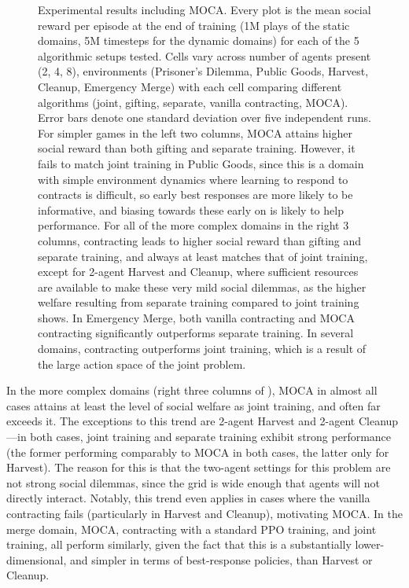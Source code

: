 \documentclass[referee,sn-basic]{sn-jnl}
\theoremstyle{thmstyleone}%
\theoremstyle{thmstyletwo}%
\theoremstyle{thmstylethree}%
\begin{document}
\begin{figure}[!ht]
\caption{Experimental results including MOCA. Every plot is the mean social reward per episode at the end of training (1M plays of the static domains, 5M timesteps for the dynamic domains) for each of the 5 algorithmic setups tested. Cells vary across number of agents present (2, 4, 8), environments (Prisoner's Dilemma, Public Goods, Harvest, Cleanup, Emergency Merge) with each cell comparing different algorithms (joint, gifting, separate, vanilla contracting, MOCA). Error bars denote one standard deviation over five independent runs. For simpler games in the left two columns, MOCA attains higher social reward than both gifting and separate training. However, it fails to match joint training in Public Goods, since this is a domain with simple environment dynamics where learning to respond to contracts is difficult, so early best responses are more likely to be informative, and biasing towards these early on is likely to help performance. For all of the more complex domains in the right 3 columns, contracting leads to higher social reward than gifting and separate training, and always at least matches that of joint training, except for 2-agent Harvest and Cleanup, where sufficient resources are available to make these very mild social dilemmas, as the higher welfare resulting from separate training compared to joint training shows. In Emergency Merge, both vanilla contracting and MOCA contracting significantly outperforms separate training. In several domains, contracting outperforms joint training, which is a result of the large action space of the joint problem.}
\label{fig:matrix}
\end{figure}

In the more complex domains (right three columns of ), MOCA in almost all cases attains at least the level of social welfare as joint training, and often far exceeds it. The exceptions to this trend are 2-agent Harvest and 2-agent Cleanup---in both cases, joint training and separate training exhibit strong performance (the former performing comparably to MOCA in both cases, the latter only for Harvest). The reason for this is that the two-agent settings for this problem are not strong social dilemmas, since the grid is wide enough that agents will not directly interact. Notably, this trend even applies in cases where the vanilla contracting fails (particularly in Harvest and Cleanup), motivating MOCA. In the merge domain, MOCA, contracting with a standard PPO training, and joint training, all perform similarly, given the fact that this is a substantially lower-dimensional, and simpler in terms of best-response policies, than Harvest or Cleanup.
\end{document}
